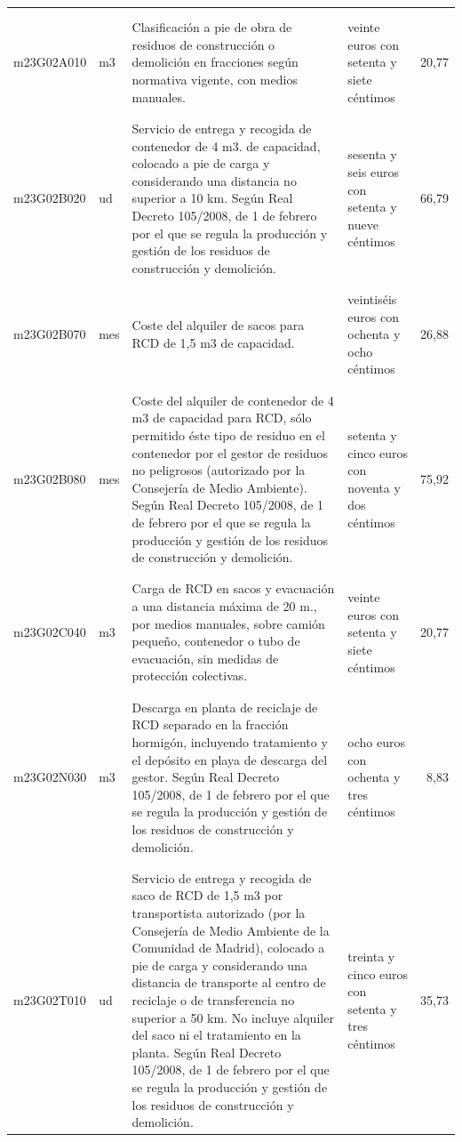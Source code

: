 \documentclass{book}%
\begin{document}
\begin{longtable}{|l|l|p{5cm}|p{3cm}|r|}
&&&&\\%
&&&&\\%
m23G02A010&m3&Clasificación a pie de obra de residuos de construcción o demolición en fracciones según normativa vigente, con medios manuales.&veinte euros con setenta y siete céntimos&20,77\\%
&&&&\\%
&&&&\\%
m23G02B020&ud&Servicio de entrega y recogida de contenedor de 4 m3. de capacidad, colocado a pie de carga y considerando una distancia no superior a 10 km. Según Real Decreto 105/2008, de 1 de febrero por el que se regula la producción y gestión de los residuos de construcción y demolición.&sesenta y seis euros con setenta y nueve céntimos&66,79\\%
&&&&\\%
&&&&\\%
m23G02B070&mes&Coste del alquiler de sacos para RCD de 1,5 m3 de capacidad.&veintiséis euros con ochenta y ocho céntimos&26,88\\%
&&&&\\%
&&&&\\%
m23G02B080&mes&Coste del alquiler de contenedor de 4 m3 de capacidad para RCD, sólo permitido éste tipo de residuo en el contenedor por el gestor de residuos no peligrosos (autorizado por la Consejería de Medio Ambiente). Según Real Decreto 105/2008, de 1 de febrero por el que se regula la producción y gestión de los residuos de construcción y demolición.&setenta y cinco euros con noventa y dos céntimos&75,92\\%
&&&&\\%
&&&&\\%
m23G02C040&m3&Carga de RCD en sacos y evacuación a una distancia máxima de 20 m., por medios manuales, sobre camión pequeño, contenedor o tubo de evacuación, sin medidas de protección colectivas.&veinte euros con setenta y siete céntimos&20,77\\%
&&&&\\%
&&&&\\%
m23G02N030&m3&Descarga en planta de reciclaje de RCD separado en la fracción hormigón, incluyendo tratamiento y el depósito en playa de descarga del gestor. Según Real Decreto 105/2008, de 1 de febrero por el que se regula la producción y gestión de los residuos de construcción y demolición.&ocho euros con ochenta y tres céntimos&8,83\\%
&&&&\\%
&&&&\\%
m23G02T010&ud&Servicio de entrega y recogida de saco de RCD de 1,5 m3 por transportista autorizado (por la Consejería de Medio Ambiente de la Comunidad de Madrid), colocado a pie de carga y considerando una distancia de transporte al centro de reciclaje o de transferencia no superior a 50 km. No incluye alquiler del saco ni el tratamiento en la planta. Según Real Decreto 105/2008, de 1 de febrero por el que se regula la producción y gestión de los residuos de construcción y demolición.&treinta y cinco euros con setenta y tres céntimos&35,73\\%

\end{longtable}
\end{document}
